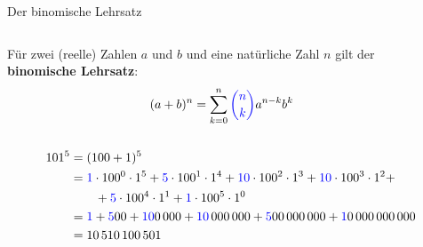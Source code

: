 \documentclass[12pt,ngerman,a4paper,ignorenonframetext,]{beamer}
\begin{document}
\begin{frame}{Der binomische Lehrsatz}
\protect\hypertarget{der-binomische-lehrsatz}{}

\begin{columns}
    \begin{column}[t]{0.74\textwidth}
        \begin{Satz}
            Für zwei (reelle) Zahlen $a$ und $b$ und eine natürliche Zahl $n$ gilt der \textbf{binomische Lehrsatz}:
            \begin{equation*}
                (a+b)^n = \sum_{k=0}^n {\color{blue} \binom{n}{k} }  a^{n-k}  b^k
            \end{equation*}
        \end{Satz}
    \end{column}
    \begin{column}[t]{0.24\textwidth}
    \vspace*{-1em}
    \end{column}
\end{columns}

\small


\begin{Beispiel}

\vspace*{-0.5em}

\begin{align*}
    101^5   &= (100+1)^5 \\
            &= {\color{blue} 1} \cdot 100^0\cdot 1^5 + {\color{blue} 5} \cdot 100^1\cdot 1^4 + {\color{blue} 10} \cdot 100^2\cdot 1^3 + {\color{blue} 10} \cdot 100^3\cdot 1^2 + \\
            &\qquad + {\color{blue} 5} \cdot 100^4\cdot 1^1 + {\color{blue} 1} \cdot 100^5\cdot 1^0\\
            &= {\color{blue} 1} + {\color{blue} 5} 00 + {\color{blue} 10} 0\,000 + {\color{blue} 10} \,000\,000 + {\color{blue} 5} 00\,000\,000 + {\color{blue} 1} 0\,000\,000\,000 \\
            &= 10\,510\,100\,501
\end{align*}

\end{Beispiel}

\end{frame}
\end{document}
